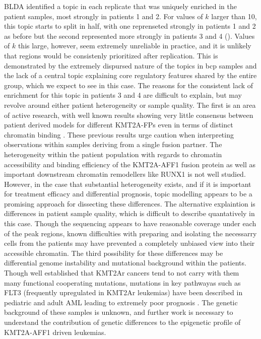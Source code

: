BLDA identified a topic in each replicate that was uniquely enriched in the patient samples, most strongly in patients 1 and 2. For values of $k$ larger than 10, this topic starts to split in half, with one reprenseted strongly in patients 1 and 2 as before but the second represented more strongly in patients 3 and 4 (). Values of $k$ this large, however, seem extremely unreliable in practice, and it is unlikely that regions would be consistenly prioritized after replication. This is demonstrated by the extremely dispursed nature of the topics in \gls{bcp} samples and the lack of a central topic explaining core regulatory features shared by the entire group, which we expect to see in this case. The reasons for the consistent lack of enrichment for this topic in patients 3 and 4 are difficult to explain, but may revolve around either patient heterogeneity or sample quality. The first is an area of active research, with well known results showing very little consensus between patient derived models for different KMT2A-FPs even in terms of distinct chromatin binding \cite{Lin2016}. These previous results urge caution when interpreting observations within samples deriving from a single fusion partner. The heterogeneity within the patient population with regards to chromatin accessibility and binding efficiency of the KMT2A-AFF1 fusion protein as well as important downstream chromatin remodellers like RUNX1 is not well studied. However, in the case that substantial heterogeneity exists, and if it is important for treatment efficacy and differential prognosis, topic modelling appears to be a promising approach for dissecting these differences. The alternative explaintion is differences in patient sample quality, which is difficult to describe quantatively in this case. Though the sequencing appears to have reasonable coverage under each of the peak regions, known difficulties with preparing and isolating the necessarry cells from the patients may have prevented a completely unbiased view into their accessible chromatin. The third possibility for these differences may be differential genome instability and mutational background within the patients. Though well established that KMT2Ar cancers tend to not carry with them many functional cooperating mutations, mutations in key pathwayas such as FLT3 (frequently upregulated in KMT2Ar leukemias) have been described in pediatric and adult AML leading to extremely poor prognosis \cite{CE2014,Sternberg2005,Sexauer2017}. The genetic background of these samples is unknown, and further work is necessary to understand the contribution of genetic differences to the epigenetic profile of KMT2A-AFF1 driven leukemias.

